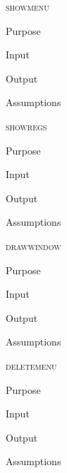 \documentclass[pdftex, 11pt]{article}
\begin{document}
\begin{description}

	\item{\textsc{showmenu}}

		\begin{description}
			\item{Purpose}


			\item{Input}


			\item{Output}


			\item{Assumptions}


		\end{description}


	\item{\textsc{showregs}}

		\begin{description}
			\item{Purpose}


			\item{Input}


			\item{Output}


			\item{Assumptions}


		\end{description}


	\item{\textsc{drawwindow}}

		\begin{description}
			\item{Purpose}


			\item{Input}


			\item{Output}


			\item{Assumptions}


		\end{description}


	\item{\textsc{deletemenu}}

		\begin{description}
			\item{Purpose}


			\item{Input}


			\item{Output}


			\item{Assumptions}



\end{description}
\end{description}
\end{document}
